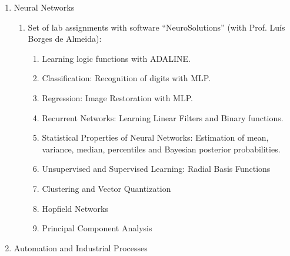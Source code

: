 \documentclass[
]{article}
\begin{document}
\begin{enumerate}
  \begin{enumerate}
  \def\labelenumii{\alph{enumii}.}
  \item
    Update of the set of slides supporting the lectures (with Prof.
    Santos-Victor).
  \item
    Lab assignment on 3D Scanner from casting shadows on objects (with
    Prof. José Santos-Victor):

    \begin{enumerate}
    \def\labelenumiii{\roman{enumiii}.}
    \item
      System calibration with checkerboard patterns through
      back-projection error minimization.
    \item
      Light source pose estimation with Least Squares
    \item
      Contour detection.
    \item
      3D reconstruction of the sequence of cast shadows.
    \end{enumerate}
  \end{enumerate}
\item
  Neural Networks

  \begin{enumerate}
  \def\labelenumii{\alph{enumii}.}
  \item
    Set of lab assignments with software ``NeuroSolutions'' (with Prof.
    Luís Borges de Almeida):

    \begin{enumerate}
    \def\labelenumiii{\roman{enumiii}.}
    \item
      Learning logic functions with ADALINE.
    \item
      Classification: Recognition of digits with MLP.
    \item
      Regression: Image Restoration with MLP.
    \item
      Recurrent Networks: Learning Linear Filters and Binary functions.
    \item
      Statistical Properties of Neural Networks: Estimation of mean,
      variance, median, percentiles and Bayesian posterior
      probabilities.
    \item
      Unsupervised and Supervised Learning: Radial Basis Functions
    \item
      Clustering and Vector Quantization
    \item
      Hopfield Networks
    \item
      Principal Component Analysis
    \end{enumerate}
  \end{enumerate}
\item
  Automation and Industrial Processes


\end{enumerate}
\end{document}

